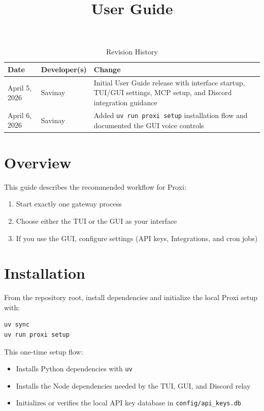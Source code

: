 \documentclass{article}
\title{User Guide\\\progname}
\author{\authname}
\date{}
\begin{document}
\setlength{\parindent}{0pt}

\begin{table}[hp]
\caption{Revision History} \label{TblRevisionHistory}
\begin{tabularx}{\textwidth}{llX}
\toprule
\textbf{Date} & \textbf{Developer(s)} & \textbf{Change}\\
\midrule
April 5, 2026 & Savinay & Initial User Guide release with interface startup, TUI/GUI settings, MCP setup, and Discord integration guidance\\
April 6, 2026 & Savinay & Added \texttt{uv run proxi setup} installation flow and documented the GUI voice controls\\
\bottomrule
\end{tabularx}
\end{table}

\newpage

\maketitle

\newpage

\section{Overview}

This guide describes the recommended workflow for Proxi:
\begin{enumerate}
	\item Start exactly one gateway process
	\item Choose either the TUI or the GUI as your interface
	\item If you use the GUI, configure settings (API keys, Integrations, and cron jobs)
\end{enumerate}

\section{Installation}

From the repository root, install dependencies and initialize the local Proxi setup with:

\begin{verbatim}
uv sync
uv run proxi setup
\end{verbatim}

This one-time setup flow:

\begin{itemize}
	\item Installs Python dependencies with \texttt{uv}
	\item Installs the Node dependencies needed by the TUI, GUI, and Discord relay
	\item Initializes or verifies the local API key database in \texttt{config/api\_keys.db}
\end{itemize}
\end{document}
